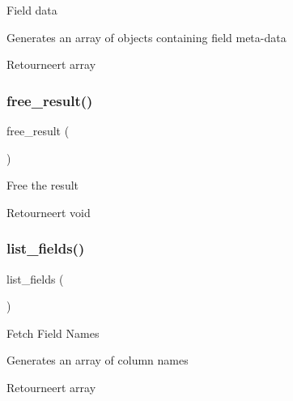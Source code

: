 Field data

Generates an array of objects containing field meta-\/data

\begin{DoxyReturn}{Retourneert}
array 
\end{DoxyReturn}
\mbox{\label{class_c_i___d_b__postgre__result_aad2d98d6beb3d6095405356c6107b473}} 
\subsubsection{\texorpdfstring{free\_result()}{free\_result()}}
{\footnotesize\ttfamily free\+\_\+result (\begin{DoxyParamCaption}{ }\end{DoxyParamCaption})}

Free the result

\begin{DoxyReturn}{Retourneert}
void 
\end{DoxyReturn}
\mbox{\label{class_c_i___d_b__postgre__result_a50b54eb4ea7cfd039740f532988ea776}} 
\subsubsection{\texorpdfstring{list\_fields()}{list\_fields()}}
{\footnotesize\ttfamily list\+\_\+fields (\begin{DoxyParamCaption}{ }\end{DoxyParamCaption})}

Fetch Field Names

Generates an array of column names

\begin{DoxyReturn}{Retourneert}
array 
\end{DoxyReturn}
\mbox{\label{class_c_i___d_b__postgre__result_af831bf363e4d7d661a717a4932af449d}} 
